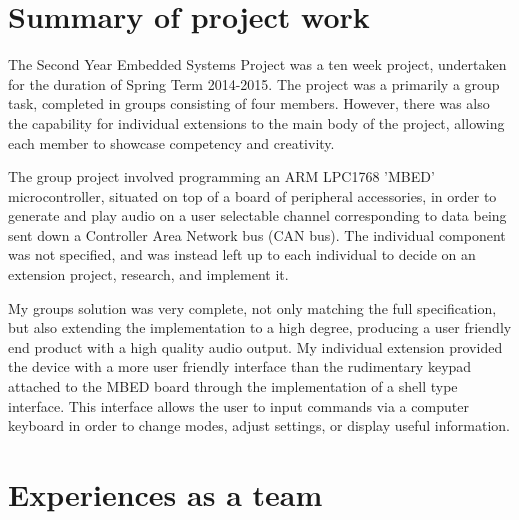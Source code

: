 \section{Summary of project work}

The Second Year Embedded Systems Project was a ten week project, undertaken 
for the duration of Spring Term 2014-2015. 
The project was a primarily a group task, completed in groups consisting of four 
members. 
However, there was also the capability for individual extensions to the main 
body of the project, allowing each member to showcase competency and creativity.
\par\bigskip\noindent
The group project involved programming an ARM LPC1768 'MBED' microcontroller, 
situated on top of a board of peripheral accessories, in order to 
generate and play audio on a user selectable channel corresponding to data 
being sent down a Controller Area Network bus (CAN bus). 
The individual component was not specified, and was instead left up to each 
individual to decide on an extension project, research, and implement it. 
\par\bigskip\noindent
My groups solution was very complete, not only matching the full specification, 
but also extending the implementation to a high degree, producing a user 
friendly end product with a high quality audio output. 
My individual extension provided the device with a more user friendly 
interface than the rudimentary keypad attached to the MBED board through the 
implementation of a shell type interface. 
This interface allows the user to input commands via a computer keyboard in 
order to change modes, adjust settings, or display useful information.

 
\section{Experiences as a team}

